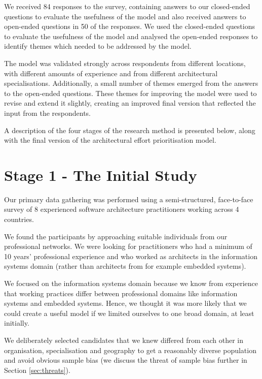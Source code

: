 We received 84 responses to the survey, containing answers to our closed-ended questions to evaluate the usefulness of the model and also received answers to open-ended questions in 50 of the responses.  We used the closed-ended questions to evaluate the usefulness of the model and analysed the open-ended responses to identify themes which needed to be addressed by the model.

The model was validated strongly across respondents from different locations, with different amounts of experience and from different architectural specialisations. Additionally, a small number of themes emerged from the answers to the open-ended questions.  These themes for improving the model were used to revise and extend it slightly, creating an improved final version that reflected the input from the respondents.

A description of the four stages of the research method is presented below, along with the final version of the architectural effort prioritisation model.

\section{Stage 1 - The Initial Study}
\label{section:initialstudy}

Our primary data gathering was performed using a semi-structured, face-to-face survey of 8 experienced software architecture practitioners working across 4 countries.

We found the participants by approaching suitable individuals from our professional networks.  We were looking for practitioners who had a minimum of 10 years' professional experience and who worked as architects in the information systems domain (rather than architects from \textendash for example \textendash embedded systems).  

We focused on the information systems domain because we know from experience that working practices differ between professional domains like information systems and embedded systems.  Hence, we thought it was more likely that we could create a useful model if we limited ourselves to one broad domain, at least initially. 

We deliberately selected candidates that we knew differed from each other in organisation, specialisation and geography to get a reasonably diverse population and avoid obvious sample bias (we discuss the threat of sample bias further in Section \ref{sec:threats}).

